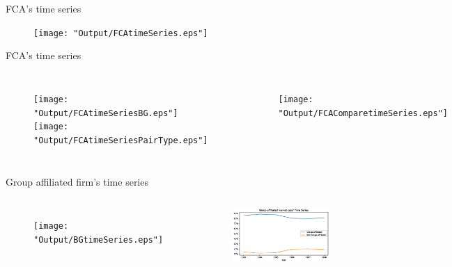 \documentclass{beamer}
\begin{document}
	\begin{frame}{FCA's time series}
		\begin{figure}
			\centering  
			\texttt{[image: "Output/FCAtimeSeries.eps"]}
			
		\end{figure} 
	\end{frame}

	\begin{frame}{FCA's time series}
		\begin{columns}
			\begin{figure}
				\centering  
				\texttt{[image: "Output/FCAtimeSeriesBG.eps"]}
				\texttt{[image: "Output/FCAtimeSeriesPairType.eps"]}
			\end{figure}    
			\begin{figure}
				\centering  
				\texttt{[image: "Output/FCAComparetimeSeries.eps"]}
			\end{figure}
          
		\end{columns}

\end{frame}

	\begin{frame}{Group affiliated firm's time series}
		\begin{columns}
	\begin{figure}
	\centering  
	\texttt{[image: "Output/BGtimeSeries.eps"]}
	
\end{figure}  
	\column{.5\textwidth}
	\begin{figure}
	\centering  
	\includegraphics[width=\linewidth]{"Output/BGMarketCaptimeSeries.eps"}
	
\end{figure} 
	
\end{columns}
\end{frame}
\end{document}
